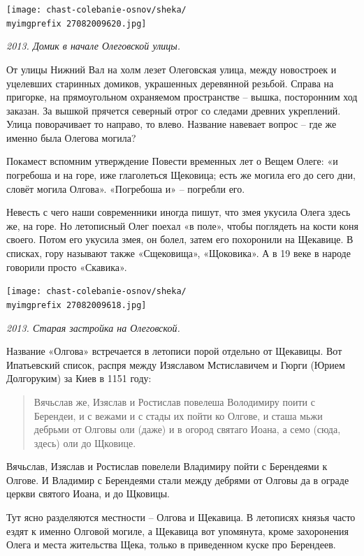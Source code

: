 \begin{center}
\texttt{[image: chast-colebanie-osnov/sheka/\\myimgprefix 27082009620.jpg]}

\textit{2013. Домик в начале Олеговской улицы.}
\end{center}

От улицы Нижний Вал на холм лезет Олеговская улица, между новостроек и уцелевших старинных домиков, украшенных деревянной резьбой. Справа на пригорке, на прямоугольном охраняемом пространстве – вышка, посторонним ход заказан. За вышкой прячется северный отрог со следами древних укреплений. Улица поворачивает то направо, то влево. Название навевает вопрос – где же именно была Олегова могила?

Покамест вспомним утверждение Повести временных лет о Вещем Олеге: «и погребоша и на горе, иже глаголеться Щековица; есть же могила его до сего дни, словёт могила Олгова». «Погребоша и» – погребли его.

Невесть с чего наши современники иногда пишут, что змея укусила Олега здесь же, на горе. Но летописный Олег поехал «в поле», чтобы поглядеть на кости коня своего. Потом его укусила змея, он болел, затем его похоронили на Щекавице. В списках, гору называют также «Сщековища», «Щоковика». А в 19 веке в народе говорили просто «Скавика».

\begin{center}
\texttt{[image: chast-colebanie-osnov/sheka/\\myimgprefix 27082009618.jpg]}

\textit{2013. Старая застройка на Олеговской.}
\end{center}

Название «Олгова» встречается в летописи порой отдельно от Щекавицы. Вот Ипатьевский список, распря между Изяславом Мстиславичем и Гюрги (Юрием Долгоруким) за Киев в 1151 году:

\begin{quotation}
Вячьслав же, Изяслав и Ростислав повелеша Володимиру поити с Берендеи, и с вежами и с стады их пойти ко Олгове, и сташа мьжи дебрьми от Олговы оли (даже) и в огород святаго Иоана, а семо (сюда, здесь) оли до Щковице.
\end{quotation}

Вячьслав, Изяслав и Ростислав повелели Владимиру пойти с Берендеями к Олгове. И Владимир с Берендеями стали между дебрями от Олговы да в ограде церкви святого Иоана, и до Щковицы.

Тут ясно разделяются местности – Олгова и Щекавица. В летописях князья часто ездят к именно Олговой могиле, а Щекавица вот упомянута, кроме захоронения Олега и места жительства Щека, только в приведенном куске про Берендеев.

